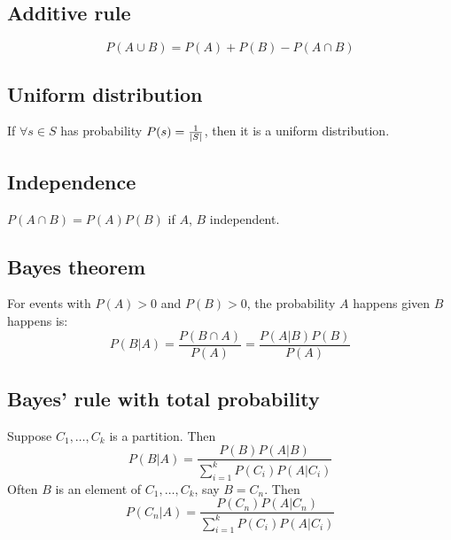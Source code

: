 \subsection{Additive rule}
    \begin{definition}
        \begin{equation}
            P(A \cup B) = P(A) + P(B) - P(A\cap B)
        \end{equation}
    \end{definition}

\subsection{Uniform distribution}
    \begin{definition}
        If $\forall s\in S$ has probability $P(s) = \frac{1}{\abs{S}}$, then it is a uniform distribution.
    \end{definition}

\subsection{Independence}
    \begin{definition}
        $P(A \cap B) = P(A)P(B)$ if $A$, $B$ independent.
    \end{definition}

\subsection{Bayes theorem}
    \begin{definition}
        For events with $P(A)>0$ and $P(B)>0$, the probability $A$ happens given $B$ happens is:
        \begin{equation}
            P(B|A) = \frac{P(B\cap A)}{P(A)} = \frac{P(A|B)P(B)}{P(A)}
        \end{equation}
    \end{definition}

\subsection{Bayes' rule with total probability}
    \begin{definition}
        Suppose $C_1,\ldots,C_k$ is a partition. Then 
        \begin{equation}
            P(B|A) = \frac{P(B)P(A|B)}{\sum_{i=1}^{k} P\left(C_i\right)P\left(A|C_i\right)}
        \end{equation}
        Often $B$ is an element of $C_1,\ldots,C_k$, say $B=C_n$. Then 
        \begin{equation}
            P\left(C_n|A\right) = \frac{P\left(C_n\right)P\left(A|C_n\right)}{\sum_{i=1}^{k} P\left(C_i\right)P\left(A|C_i\right)}
        \end{equation}
    \end{definition}

